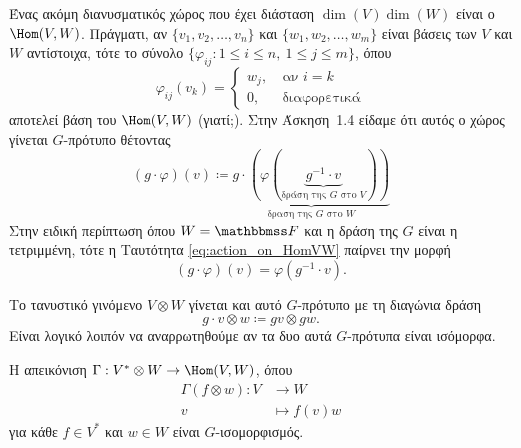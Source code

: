 \documentclass[12pt,a4paper,reqno]{amsart}
\begin{document}
Ένας ακόμη διανυσματικός χώρος που έχει διάσταση $\dim(V)\dim(W)$ είναι ο $\Hom(V,W)$. Πράγματι, αν $\{v_1, v_2, \dots, v_n\}$ και $\{w_1, w_2, \dots, w_m\}$ είναι βάσεις των $V$ και $W$ αντίστοιχα, τότε το σύνολο $\{\varphi_{ij} : 1 \le i \le n, \ 1 \le j \le m\}$, όπου 
\[
\varphi_{ij}(v_k) =
\begin{cases}
    w_j, &\ \text{αν $i=k$} \\ 
    0,   &\ \text{διαφορετικά}
\end{cases}
\]
αποτελεί βάση του $\Hom(V,W)$ (γιατί;). Στην Άσκηση~1.4 είδαμε ότι αυτός ο χώρος γίνεται $G$-πρότυπο θέτοντας 
\begin{equation}
    \label{eq:action_on_HomVW}
(g \cdot \varphi)(v) \coloneqq \underbrace{g \cdot \left(\varphi(\underbrace{g^{-1}\cdot{v}}_{\text{δράση της $G$ στο $V$}})\right)}_{\text{δραση της $G$ στο $W$}}
\end{equation}
Στην ειδική περίπτωση όπου $W = \FF$ και η δράση της $G$ είναι η τετριμμένη, τότε η Ταυτότητα \eqref{eq:action_on_HomVW} παίρνει την μορφή 
\[
(g \cdot \varphi)(v) = \varphi(g^{-1}\cdot{v}).
\]

Το τανυστικό γινόμενο $V \otimes W$ γίνεται και αυτό $G$-πρότυπο με τη διαγώνια δράση 
\[
g \cdot v\otimes w \coloneqq gv \otimes gw. 
\]
Είναι λογικό λοιπόν να αναρρωτηθούμε αν τα δυο αυτά $G$-πρότυπα είναι ισόμορφα. 
\begin{theorem}
    \label{thm:vdual_tensor_w_cong_homvw}
    Η απεικόνιση $\Gamma : V^\ast \otimes W \to \Hom(V,W)$, όπου 
    \begin{align*}
    \Gamma(f \otimes w) : V &\to W \\
        v &\mapsto f(v)w
    \end{align*}
    για κάθε $f \in V^\ast$ και $w \in W$ είναι $G$-ισομορφισμός.
\end{theorem}
\end{document}
